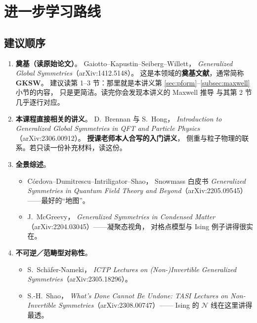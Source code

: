 \documentclass[UTF8,a4paper,11pt]{ctexart}
\theoremstyle{plain}
\theoremstyle{definition}
\theoremstyle{remark}
\begin{document}
\section{进一步学习路线}
\label{sec:further}

\subsection{建议顺序}

\begin{enumerate}[label=\textbf{阶段 \arabic*：},leftmargin=1.9cm]
  \item \textbf{奠基（读原始论文）}。
        Gaiotto--Kapustin--Seiberg--Willett，
        \emph{Generalized Global Symmetries}（arXiv:1412.5148）。
        这是本领域的\textbf{奠基文献}，通常简称 \textbf{GKSW}。
        建议读第 1--3 节：那里就是本讲义第
        \ref{sec:pform}--\ref{subsec:maxwell} 小节的内容，
        只是更简洁。读完你会发现本讲义的 Maxwell 推导
        与其第 2 节几乎逐行对应。
  \item \textbf{本课程直接相关的讲义}。
        D.~Brennan 与 S.~Hong，
        \emph{Introduction to Generalized Global Symmetries in QFT
        and Particle Physics}（arXiv:2306.00912）。
        \textbf{授课老师本人合写的入门讲义}，
        侧重与粒子物理的联系。若只读一份补充材料，读这份。
  \item \textbf{全景综述}。
        \begin{itemize}
          \item Córdova--Dumitrescu--Intriligator--Shao，
                Snowmass 白皮书
                \emph{Generalized Symmetries in Quantum Field Theory
                and Beyond}（arXiv:2205.09545）——最好的“地图”。
          \item J.~McGreevy，
                \emph{Generalized Symmetries in Condensed Matter}
                （arXiv:2204.03045）——凝聚态视角，
                对格点模型与 Ising 例子讲得很实在。
        \end{itemize}
  \item \textbf{不可逆／范畴型对称性}。
        \begin{itemize}
          \item S.~Schäfer-Nameki，
                \emph{ICTP Lectures on (Non-)Invertible Generalized
                Symmetries}（arXiv:2305.18296）。
          \item S.-H.~Shao，
                \emph{What's Done Cannot Be Undone: TASI Lectures on
                Non-Invertible Symmetries}（arXiv:2308.00747）——
                Ising 的 $\mathcal N$ 线在这里讲得最透。

\end{itemize}
\end{enumerate}
\end{document}

